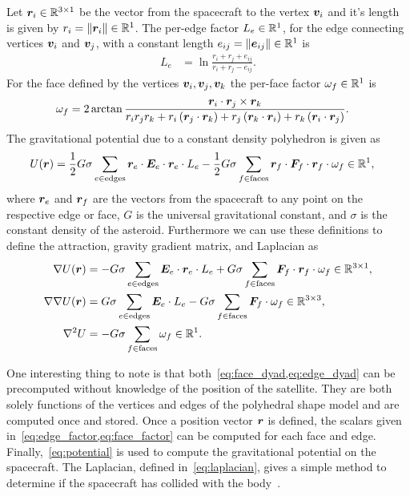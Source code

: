 Let \( \bm{r}_i \in \mathbb{R}^{3 \times 1} \) be the vector from the spacecraft to the vertex \( \bm{v}_i \) and it's length is given by \( r_i = \left\| \bm{r}_i \right\| \in \mathbb{R}^{1} \).
The per-edge factor \( L_e \in \mathbb{R}^{1}\), for the edge connecting vertices \( \bm{v}_i \) and \( \bm{v}_j \), with a constant length \( e_{ij} = \left\| \bm{e}_{ij} \right\| \in \mathbb{R}^1\) is
\begin{align}\label{eq:edge_factor}
    L_e &= \ln \frac{r_i + r_j + e_{ij}}{r_i + r_j - e_{ij}}.
\end{align}
For the face defined by the vertices \( \bm{v}_i, \bm{v}_j, \bm{v}_k \) the per-face factor \( \omega_f \in \mathbb{R}^{1} \) is
\begin{align}\label{eq:face_factor}
    \omega_f &= 2 \arctan \frac{\bm{r}_i \cdot \bm{r}_j \times \bm{r}_k}{r_i r_j r_k + r_i \left( \bm{r}_j \cdot \bm{r}_k \right) + r_j \left( \bm{r}_k \cdot \bm{r}_i \right) + r_k \left( \bm{r}_i \cdot \bm{r}_j \right)}.
\end{align}
The gravitational potential due to a constant density polyhedron is given as
\begin{align}\label{eq:potential}
    U(\bm{r}) &= \frac{1}{2} G \sigma \sum_{e \in \text{edges}} \bm{r}_e \cdot \bm{E}_e \cdot \bm{r}_e \cdot L_e - \frac{1}{2}G \sigma \sum_{f \in \text{faces}} \bm{r}_f \cdot \bm{F}_f \cdot \bm{r}_f \cdot \omega_f \in \mathbb{R}^1,
\end{align}
where \( \bm{r}_e\) and \(\bm{r}_f \) are the vectors from the spacecraft to any point on the respective edge or face, \( G\) is the universal gravitational constant, and \( \sigma \) is the constant density of the asteroid.
Furthermore we can use these definitions to define the attraction, gravity gradient matrix, and Laplacian as
\begin{align}
    \nabla U ( \bm{r} ) &= -G \sigma \sum_{e \in \text{edges}} \bm{E}_e \cdot \bm{r}_e \cdot L_e + G \sigma \sum_{f \in \text{faces}} \bm{F}_f \cdot \bm{r}_f \cdot \omega_f \in \mathbb{R}^{3 \times 1} , \label{eq:attraction}\\
    \nabla \nabla U ( \bm{r} ) &= G \sigma \sum_{e \in \text{edges}} \bm{E}_e  \cdot L_e - G \sigma \sum_{f \in \text{faces}} \bm{F}_f \cdot \omega_f \in \mathbb{R}^{3 \times 3}, \label{eq:gradient_matrix}\\
    \nabla^2 U &= -G \sigma \sum_{f \in \text{faces}}  \omega_f \in \mathbb{R}^1.\label{eq:laplacian}
\end{align}

One interesting thing to note is that both~\cref{eq:face_dyad,eq:edge_dyad} can be precomputed without knowledge of the position of the satellite.
They are both solely functions of the vertices and edges of the polyhedral shape model and are computed once and stored.
Once a position vector \( \bm{r} \) is defined, the scalars given in~\cref{eq:edge_factor,eq:face_factor} can be computed for each face and edge.
Finally,~\cref{eq:potential} is used to compute the gravitational potential on the spacecraft.
The Laplacian, defined in~\cref{eq:laplacian}, gives a simple method to determine if the spacecraft has collided with the body~\cite{werner1996}. 



